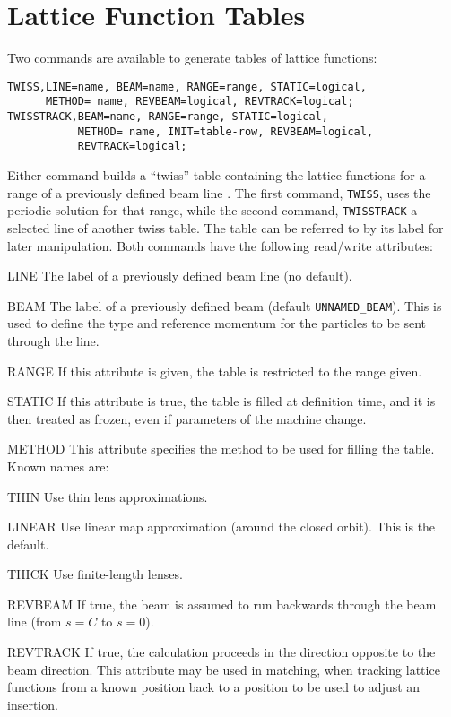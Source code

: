 \section{Lattice Function Tables}
\label{sec:twiss}

Two commands are available to generate tables of lattice functions:
\begin{verbatim}
TWISS,LINE=name, BEAM=name, RANGE=range, STATIC=logical,
      METHOD= name, REVBEAM=logical, REVTRACK=logical;
TWISSTRACK,BEAM=name, RANGE=range, STATIC=logical,
           METHOD= name, INIT=table-row, REVBEAM=logical,
           REVTRACK=logical;
\end{verbatim}

Either command builds a ``twiss'' table containing the lattice functions for
a range of a previously defined beam line .
The first command, \texttt{TWISS}, uses the periodic solution for that
range, while the second command, \texttt{TWISSTRACK} a selected line
of another twiss table.
The table can be referred to by its label for later manipulation.
Both commands have the following read/write attributes:
\begin{kdescription}
\item[LINE]
  The label of a previously defined beam line (no default).
\item[BEAM]
  The label of a previously defined beam (default \texttt{UNNAMED\_BEAM}).
  This is used to define the type and reference momentum for the
  particles to be sent through the line.
\item[RANGE]
  If this attribute is given, the table is restricted to the range given.
\item[STATIC]
  If this attribute is true, the table is filled at definition time,
  and it is then treated as frozen, even if parameters of the machine change.
\item[METHOD]
  This attribute specifies the method to be used for filling the table.
  Known names are:
  \begin{kdescription}
  \item[THIN]
    Use thin lens approximations.
  \item[LINEAR]
    Use linear map approximation (around the closed orbit).
    This is the default.
  \item[THICK]
    Use finite-length lenses.
  \end{kdescription}
\item[REVBEAM]
  If true, the beam is assumed to run backwards through the beam line
  (from $s=C$ to $s=0$).
\item[REVTRACK]
  If true, the calculation proceeds in the direction opposite to the beam
  direction.
  This attribute may be used in matching, when tracking lattice
  functions from a known position back to a position to be used to
  adjust an insertion.
\end{kdescription}
